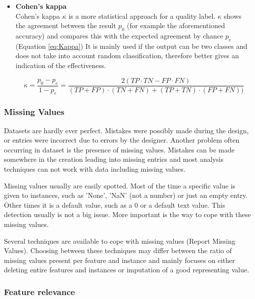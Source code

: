 \documentclass[10pt,a4paper]{article}
\begin{document}
\begin{itemize}
		\item \textbf{Cohen's kappa} \\
		Cohen's kappa $\kappa$ is a more statistical approach for a quality label. $\kappa$ shows the agreement between the result $p_0$ (for example the aforementioned accuracy) and compares this with the expected agreement by chance $p_e$ (Equation \ref{eq:Kappa}) It is mainly used if the output can be two classes\cite{blackman2000interval} and does not take into account random classification, therefore better gives an indication of the effectiveness.
		
		\begin{equation}\label{eq:Kappa}
		\kappa = \frac{p_0 - p_e}{1 - p_e} = \frac{2(TP \cdot TN - FP \cdot FN)}{(TP + FP) \cdot (TN + FN) + (TP + TN) \cdot (FP + FN))}
		\end{equation} 
	\end{itemize}
	\subsubsection{Missing Values}
	\label{subsec:MissingValues}
	
	Datasets are hardly ever perfect. Mistakes were possibly made during the design, or entries were incorrect due to errors by the designer. Another problem often occurring in dataset is the presence of missing values. Mistakes can be made somewhere in the creation leading into missing entries and most analysis techniques can not work with data including missing values.
	
	Missing values usually are easily spotted. Most of the time a specific value is given to instances, such as 'None', 'NaN' (not a number) or just an empty entry. Other times it is a default value, such as a $0$ or a default text value. This detection usually is not a big issue. More important is the way to cope with these missing values.
	
	Several techniques are available to cope with missing values (Report Missing Values). Choosing between these techniques may differ between the ratio of missing values present per feature and instance and mainly focuses on either deleting entire features and instances or imputation of a good representing value.
	
	\subsubsection{Feature relevance}
	\label{subsec:FeatureSelection}
	
\end{document}
